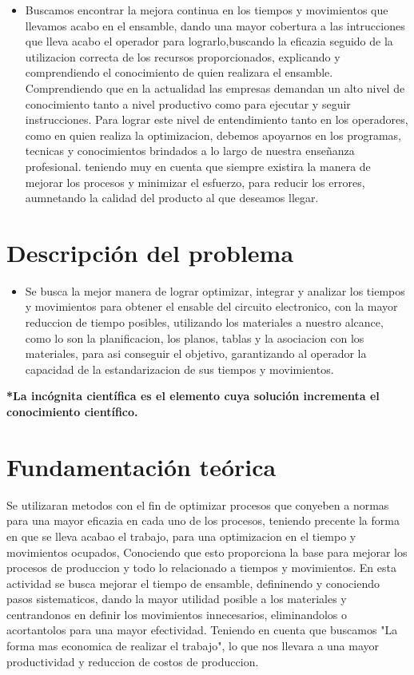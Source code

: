     \begin{itemize}
        \item Buscamos encontrar la mejora continua en los tiempos y movimientos que llevamos acabo en el ensamble, dando una mayor cobertura a las intrucciones que lleva acabo el operador para lograrlo,buscando la eficazia seguido de la utilizacion correcta de los recursos proporcionados, explicando y comprendiendo el conocimiento de quien realizara el ensamble. 
        Comprendiendo que en la actualidad las empresas demandan un alto nivel de conocimiento tanto a nivel productivo como para ejecutar y seguir instrucciones. 
        Para lograr este nivel de entendimiento tanto en los operadores, como en quien realiza la optimizacion, debemos apoyarnos en los programas, tecnicas y conocimientos brindados a lo largo de nuestra enseñanza profesional. teniendo muy en cuenta que siempre existira la manera de mejorar los procesos y minimizar el esfuerzo, para reducir los errores, aumnetando la calidad del producto al que deseamos llegar. 
    \end{itemize}
    \section{Descripción del problema}
    \begin{itemize}
        \item Se busca la mejor manera de lograr optimizar, integrar y analizar los tiempos y movimientos para obtener el ensable del circuito electronico, con la mayor reduccion de tiempo posibles, utilizando los materiales a nuestro alcance, como lo son la planificacion, los planos, tablas y la asociacion con los materiales, para asi conseguir el objetivo, garantizando al operador la capacidad de la estandarizacion de sus tiempos y movimientos.
    \end{itemize}
    
    \textbf{*La incógnita científica es el elemento cuya solución incrementa el conocimiento
    científico.}
    \section{Fundamentación teórica}
    
    Se utilizaran metodos con el fin de optimizar procesos que conyeben a normas para una mayor eficazia en cada uno de los procesos, teniendo precente la forma en que se lleva acabao el trabajo, para una optimizacion en el tiempo y movimientos ocupados, Conociendo que esto proporciona la base para mejorar los procesos de produccion  y todo lo relacionado a tiempos y movimientos. En esta actividad se busca mejorar el tiempo de ensamble, defininendo y conociendo pasos sistematicos, dando la mayor utilidad posible a los materiales y centrandonos en definir los movimientos innecesarios, eliminandolos o acortantolos para una mayor efectividad. Teniendo en cuenta que buscamos "La forma mas economica de realizar el trabajo", lo que nos llevara a una mayor productividad y reduccion de costos de produccion. 
    
